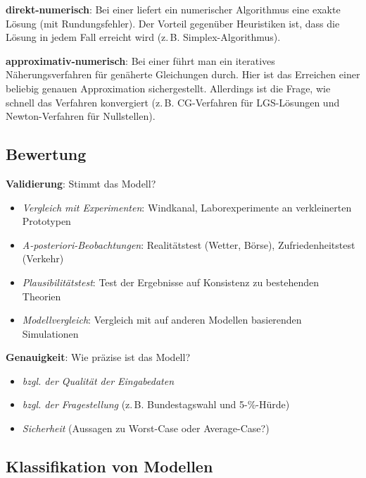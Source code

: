 \textbf{direkt-numerisch}:
Bei einer  liefert ein numerischer Algorithmus eine exakte
Lösung (mit Rundungsfehler).
Der Vorteil gegenüber Heuristiken ist, dass die Lösung in jedem Fall erreicht wird
(z.\,B. Simplex-Algorithmus).

\textbf{approximativ-numerisch}:
Bei einer  führt man ein iteratives Näherungsverfahren
für genäherte Gleichungen durch.
Hier ist das Erreichen einer beliebig genauen Approximation sichergestellt.
Allerdings ist die Frage, wie schnell das Verfahren konvergiert
(z.\,B. CG-Verfahren für LGS-Lösungen und Newton-Verfahren für Nullstellen).

\pagebreak

\subsection{%
    Bewertung%
}

\textbf{Validierung}:
Stimmt das Modell?
\begin{itemize}
    \item
    \emph{Vergleich mit Experimenten}:
    Windkanal,
    Laborexperimente an verkleinerten Prototypen

    \item
    \emph{A-posteriori-Beobachtungen}:
    Realitätstest (Wetter, Börse),
    Zufriedenheitstest (Verkehr)

    \item
    \emph{Plausibilitätstest}:
    Test der Ergebnisse auf Konsistenz zu bestehenden Theorien

    \item
    \emph{Modellvergleich}:
    Vergleich mit auf anderen Modellen basierenden Simulationen
\end{itemize}

\textbf{Genauigkeit}:
Wie präzise ist das Modell?
\begin{itemize}
    \item
    \emph{bzgl. der Qualität der Eingabedaten}

    \item
    \emph{bzgl. der Fragestellung}
    (z.\,B. Bundestagswahl und 5-\%-Hürde)

    \item
    \emph{Sicherheit}
    (Aussagen zu Worst-Case oder Average-Case?)
\end{itemize}

\subsection{%
    Klassifikation von Modellen%
}

